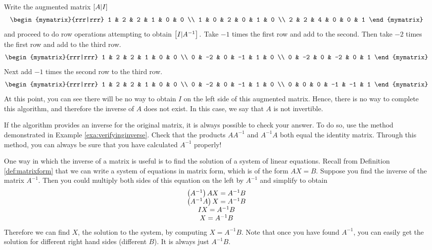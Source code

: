 \begin{solution} Write the augmented matrix $\left[A|I\right] $
\begin{equation*}
\begin{mymatrix}{rrr|rrr}
1 & 2 & 2 & 1 & 0 & 0 \\
1 & 0 & 2 & 0 & 1 & 0 \\
2 & 2 & 4 & 0 & 0 & 1
\end{mymatrix}
\end{equation*}
and proceed to do row operations attempting to obtain $\left[
I|A^{-1}\right] .$ Take $-1$ times the first row and add to the
second. Then take $ -2 $ times the first row and add to the
third row.
\begin{equation*}
\begin{mymatrix}{rrr|rrr}
1 & 2 & 2 & 1 & 0 & 0 \\
0 & -2 & 0 & -1 & 1 & 0 \\
0 & -2 & 0 & -2 & 0 & 1
\end{mymatrix}
\end{equation*}
Next add $-1 $ times the second row to the third row.
\begin{equation*}
\begin{mymatrix}{rrr|rrr}
1 & 2 & 2 & 1 & 0 & 0 \\
0 & -2 & 0 & -1 & 1 & 0 \\
0 & 0 & 0 & -1 & -1 & 1
\end{mymatrix}
\end{equation*}
At this point, you can see there will be no way to obtain $I$ on the
left side of this augmented matrix.  Hence, there is no way to
complete this algorithm, and therefore the inverse of $A$ does not
exist. In this case, we say that $A$ is not invertible.
\end{solution}

If the algorithm provides an inverse for the original matrix, it is always possible to check your answer.
To do so, use the method demonstrated in Example \ref{exa:verifyinginverse}. Check that the products $AA^{-1}$ and $A^{-1}A$ both equal the 
identity matrix. Through this method, you can always be sure that you have calculated $A^{-1}$ properly!

One way in which the inverse of a matrix is useful is to find the solution of a system of linear equations.
Recall from Definition \ref{def:matrixform} that we can write a system of equations in matrix form, 
which is of the form $AX=B$. Suppose you find the
inverse of the matrix $A^{-1}$. Then you could multiply both sides of this
equation on the left by $A^{-1}$ and simplify to obtain
\begin{equation*}
\begin{array}{c}
\left(A^{-1} \right) AX =A^{-1}B \\
\left(A^{-1}A\right) X = A^{-1}B \\
IX = A^{-1}B \\
X = A^{-1}B
\end{array}
\end{equation*}
Therefore we can find $X$, the solution to the system, by computing $X=A^{-1}B$. 
Note that once you
have found $A^{-1}$, you can easily get the solution for different right
hand sides (different $B$). It is always just $A^{-1}B$. 
 
